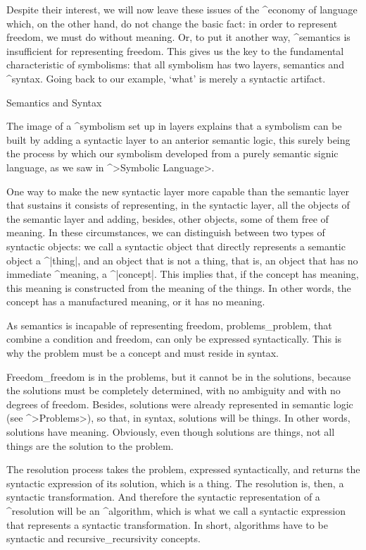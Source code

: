 Despite their interest, we will now leave these issues of the ^{economy
of language} which, on the other hand, do not change the basic fact: in
order to represent freedom, we must do without meaning. Or, to put it
another way, ^{semantics} is insufficient for representing freedom. This
gives us the key to the fundamental characteristic of symbolisms: that
all symbolism has two layers, semantics and ^{syntax}. Going back to our
example, `what' is merely a syntactic artifact.


\Section Semantics and Syntax

The image of a ^{symbolism} set up in layers explains that a symbolism
can be built by adding a syntactic layer to an anterior semantic logic,
this surely being the process by which our symbolism developed from a
purely semantic signic language, as we saw in ^>Symbolic Language>.

One way to make the new syntactic layer more capable than the semantic
layer that sustains it consists of representing, in the syntactic layer,
all the objects of the semantic layer and adding, besides, other
objects, some of them free of meaning. In these circumstances, we can
distinguish between two types of syntactic objects: we call a syntactic
object that directly represents a semantic object a ^|thing|, and an
object that is not a thing, that is, an object that has no immediate
^{meaning}, a ^|concept|. This implies that, if the concept has meaning,
this meaning is constructed from the meaning of the things. In other
words, the concept has a manufactured meaning, or it has no meaning.

As semantics is incapable of representing freedom, problems_{problem},
that combine a condition and freedom, can only be expressed
syntactically. This is why the problem must be a concept and must reside
in syntax.

Freedom_{freedom} is in the problems, but it cannot be in the solutions,
because the solutions must be completely determined, with no ambiguity
and with no degrees of freedom. Besides, solutions were already
represented in semantic logic (see ^>Problems>), so that, in syntax,
solutions will be things. In other words, solutions have meaning.
Obviously, even though solutions are things, not all things are the
solution to the problem.

The resolution process takes the problem, expressed syntactically, and
returns the syntactic expression of its solution, which is a thing. The
resolution is, then, a syntactic transformation. And therefore the
syntactic representation of a ^{resolution} will be an ^{algorithm},
which is what we call a syntactic expression that represents a syntactic
transformation. In short, algorithms have to be syntactic and
recursive_{recursivity} concepts.

